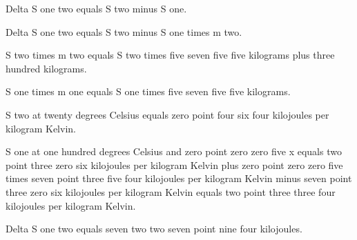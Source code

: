 Delta S one two equals S two minus S one.  

Delta S one two equals S two minus S one times m two.  

S two times m two equals S two times five seven five five kilograms plus three hundred kilograms.  

S one times m one equals S one times five seven five five kilograms.  

S two at twenty degrees Celsius equals zero point four six four kilojoules per kilogram Kelvin.  

S one at one hundred degrees Celsius and zero point zero zero five x equals two point three zero six kilojoules per kilogram Kelvin plus zero point zero zero five times seven point three five four kilojoules per kilogram Kelvin minus seven point three zero six kilojoules per kilogram Kelvin equals two point three three four kilojoules per kilogram Kelvin.  

Delta S one two equals seven two two seven point nine four kilojoules.